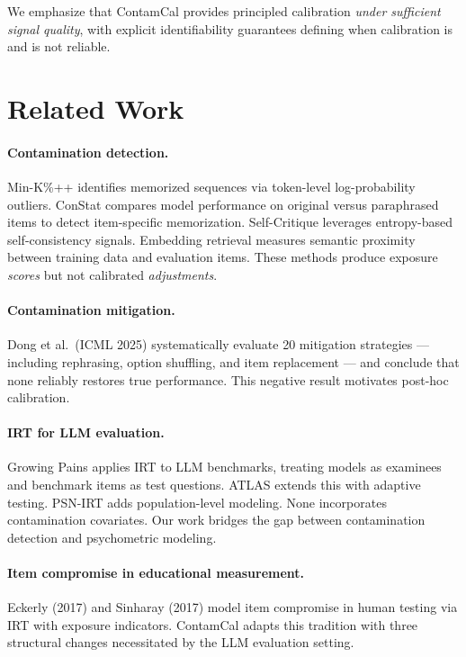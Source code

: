 \documentclass[letterpaper,11pt]{article}
\begin{document}
We emphasize that ContamCal provides principled calibration \emph{under sufficient signal quality}, with explicit identifiability guarantees defining when calibration is and is not reliable.

\section{Related Work}

\paragraph{Contamination detection.}
Min-K\%++ identifies memorized sequences via token-level log-probability outliers. ConStat compares model performance on original versus paraphrased items to detect item-specific memorization. Self-Critique leverages entropy-based self-consistency signals. Embedding retrieval measures semantic proximity between training data and evaluation items. These methods produce exposure \emph{scores} but not calibrated \emph{adjustments}.

\paragraph{Contamination mitigation.}
Dong et al.\ (ICML 2025) systematically evaluate 20 mitigation strategies --- including rephrasing, option shuffling, and item replacement --- and conclude that none reliably restores true performance. This negative result motivates post-hoc calibration.

\paragraph{IRT for LLM evaluation.}
Growing Pains applies IRT to LLM benchmarks, treating models as examinees and benchmark items as test questions. ATLAS extends this with adaptive testing. PSN-IRT adds population-level modeling. None incorporates contamination covariates. Our work bridges the gap between contamination detection and psychometric modeling.

\paragraph{Item compromise in educational measurement.}
Eckerly (2017) and Sinharay (2017) model item compromise in human testing via IRT with exposure indicators. ContamCal adapts this tradition with three structural changes necessitated by the LLM evaluation setting.
\end{document}
